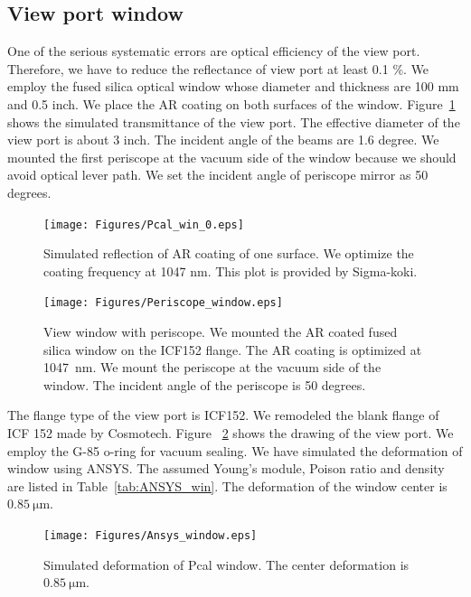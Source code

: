 \subsection{View port window}
One of the serious systematic errors are optical efficiency of the view port. Therefore, we have to reduce the reflectance of  view port at least 0.1 \%. We employ the fused silica optical window whose diameter and thickness are 100 mm and 0.5 inch. We place the AR coating on both surfaces of the window. Figure~\ref{fig:Pcal_win_0} shows the simulated transmittance of the view port. The effective diameter of the view port is about 3 inch. The incident angle of the beams are 1.6 degree. We mounted the first periscope at the vacuum side of the window because we should avoid optical lever path. We set the incident angle of periscope mirror as 50 degrees.

\begin{figure}
\begin{center}
\texttt{[image: Figures/Pcal\_win\_0.eps]}
\caption{Simulated reflection of AR coating of one surface. We optimize the coating frequency at 1047 nm. This plot is provided by Sigma-koki.} 
\label{fig:Pcal_win_0} 
\end{center}
\end{figure}

\begin{figure}
\begin{center}
\texttt{[image: Figures/Periscope\_window.eps]}
\caption{View window with periscope. We mounted the AR coated fused silica window on  the ICF152 flange. The AR coating is optimized at 1047~nm. We mount the periscope at the vacuum side of the window. The incident angle of the periscope is 50 degrees.} 
\label{fig:Pcal_window} 
\end{center}
\end{figure}

The flange type of the view port is ICF152. We remodeled the blank flange of ICF 152 made by Cosmotech. Figure ~\ref{fig:Pcal_window} shows the drawing of the view port. We employ the G-85 o-ring for vacuum sealing. 
We have simulated the deformation of window using ANSYS. The assumed Young's module, Poison ratio and density are listed in Table~\ref{tab:ANSYS_win}. The deformation of the window center is $0.85~\mathrm{\mu m}$.

\begin{figure}
\begin{center}
\texttt{[image: Figures/Ansys\_window.eps]}
\caption{Simulated deformation of Pcal window. The center deformation is $0.85~\mathrm{\mu m}$.} 
\label{fig:Ansys_window} 
\end{center}
\end{figure}

